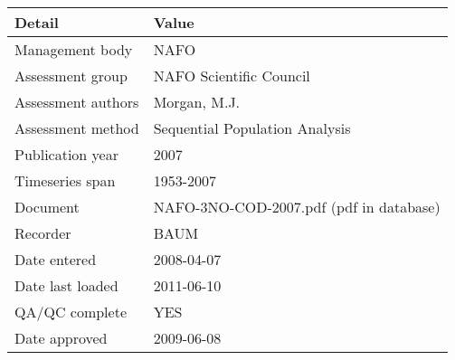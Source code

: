 \begin{table}[htb]
\centering
\begin{tabular}{lp{7cm}}
\toprule
Detail & Value \\
\midrule
Management body    & NAFO                                    \\
Assessment group   & NAFO Scientific Council                 \\
Assessment authors & Morgan, M.J.                            \\
Assessment method  & Sequential Population Analysis          \\
Publication year   & 2007                                    \\
Timeseries span    & 1953-2007                               \\
Document           & NAFO-3NO-COD-2007.pdf (pdf in database) \\
Recorder           & BAUM                                    \\
Date entered       & 2008-04-07                              \\
Date last loaded   & 2011-06-10                              \\
QA/QC complete     & YES                                     \\
Date approved      & 2009-06-08                              \\
\bottomrule
\end{tabular}
\label{tab:assessdet}
\end{table}
